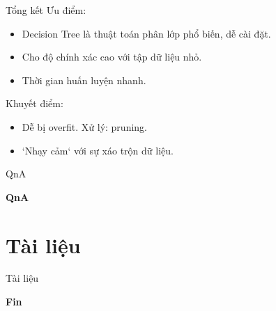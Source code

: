 \documentclass[aspectratio=169,xcolor=dvipsnames]{beamer}
\begin{document}
\begin{frame}{Tổng kết}
Ưu điểm:
\begin{itemize}
\item Decision Tree là thuật toán phân lớp phổ biến, dễ cài đặt.
\item Cho độ chính xác cao với tập dữ liệu nhỏ.
\item Thời gian huấn luyện nhanh.
\end{itemize}
Khuyết điểm:
\begin{itemize}
\item Dễ bị overfit. Xử lý: pruning.
\item `Nhạy cảm` với sự xáo trộn dữ liệu.\cite{Kowsari_2019}
\end{itemize}
\end{frame}

\begin{frame}{QnA}
    \Huge{\centerline{\textbf{QnA}}}
\end{frame}

\section{Tài liệu}

\begin{frame}{Tài liệu}
    \printbibliography
\end{frame}

\begin{frame}
    \Huge{\centerline{\textbf{Fin}}}
\end{frame}
\end{document}
